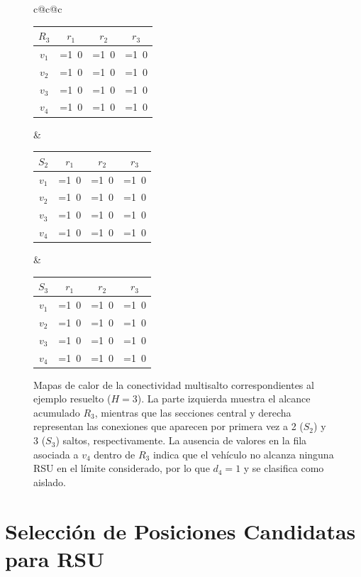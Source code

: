 \documentclass[smartcities,article,submit,oneauthor]{Definitions/mdpi}
\begin{document}
\begin{figure}[H]
\centering
\newcommand{\hc}[1]{\ifnum#1=1\cellcolor{blue!55}\textcolor{white}{1}\else\cellcolor{gray!8}0\fi}
\small
\begin{tabular}{c@{\hskip 8mm}c@{\hskip 8mm}c}
\begin{tabular}{c|ccc}
$R_3$ & $r_1$ & $r_2$ & $r_3$\\\hline
$v_1$ & \hc1 & \hc1 & \hc1\\
$v_2$ & \hc1 & \hc1 & \hc1\\
$v_3$ & \hc1 & \hc1 & \hc1\\
$v_4$ & \hc0 & \hc0 & \hc0\\
\end{tabular}
&
\begin{tabular}{c|ccc}
$S_2$ & $r_1$ & $r_2$ & $r_3$\\\hline
$v_1$ & \hc0 & \hc0 & \hc1\\
$v_2$ & \hc1 & \hc1 & \hc0\\
$v_3$ & \hc0 & \hc0 & \hc1\\
$v_4$ & \hc0 & \hc0 & \hc0\\
\end{tabular}
&
\begin{tabular}{c|ccc}
$S_3$ & $r_1$ & $r_2$ & $r_3$\\\hline
$v_1$ & \hc0 & \hc1 & \hc0\\
$v_2$ & \hc0 & \hc0 & \hc0\\
$v_3$ & \hc1 & \hc0 & \hc0\\
$v_4$ & \hc0 & \hc0 & \hc0\\
\end{tabular}
\end{tabular}
\caption{Mapas de calor de la conectividad multisalto correspondientes al ejemplo
resuelto ($H=3$). La parte izquierda muestra el alcance acumulado $R_3$, mientras
que las secciones central y derecha representan las conexiones que aparecen por
primera vez a 2 ($S_2$) y 3 ($S_3$) saltos, respectivamente. La ausencia de valores
en la fila asociada a $v_4$ dentro de $R_3$ indica que el vehículo no alcanza ninguna
RSU en el límite considerado, por lo que $d_4=1$ y se clasifica como aislado.
\label{fig:heat}}
\end{figure}

\section{Selección de Posiciones Candidatas para RSU}\label{sec:rsu}
\end{document}
